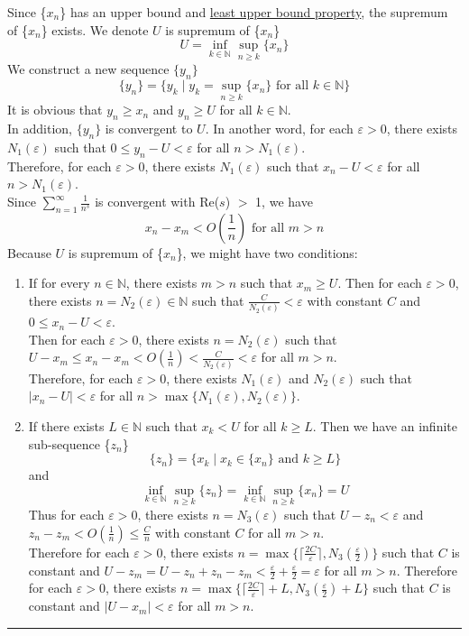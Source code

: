 \documentclass[12pt]{article}
\numberwithin{equation}{section}
\theoremstyle{plain} %
\theoremstyle{definition}
\theoremstyle{remark}
\newenvironment{proof}{{\bf Proof:}}{\hfill\rule{2mm}{2mm}}
\begin{document}
\begin{proof}
Since \{$x_n$\} has an upper bound and \href{https://en.wikipedia.org/wiki/Least-upper-bound_property}{least upper bound property}, the supremum of \{$x_n$\} exists. We denote $U$ is supremum of \{$x_n$\}
$$U = \inf\limits_{k \in \mathbb{N}}\sup\limits_{n \geqslant k}\{x_n\}$$
We construct a new sequence $\{y_n\}$ 
$$\{y_n\} = \{y_k \mid y_k = \sup\limits_{n \geqslant k}\{x_n\} \text{ for all }k \in \mathbb{N}\}$$ 
It is obvious that $y_n \geqslant x_n$ and $y_n \geqslant U$ for all $k \in \mathbb{N}$. \\
In addition, $\{y_n\}$ is convergent to $U$. In another word, for each $\varepsilon > 0$, there exists $N_1(\varepsilon)$ such that $0 \leqslant y_n - U < \varepsilon$ for all $n > N_1(\varepsilon)$.\\
Therefore, for each $\varepsilon > 0$, there exists $N_1(\varepsilon)$ such that $x_n - U < \varepsilon$ for all $n > N_1(\varepsilon)$. \\
Since $\sum_{n=1}^{\infty} \frac{1}{n^s}$ is convergent with Re($s$) $>$ 1, we have $$x_n - x_m < O(\frac{1}{n})\text{ for all }m > n$$
Because $U$ is supremum of \{$x_n$\}, we might have two conditions: 
\begin{enumerate}
	\item If for every $n \in \mathbb{N}$, there exists $m > n$ such that $x_m \geqslant U$. Then for each $\varepsilon > 0$, there exists $n = N_2(\varepsilon) \in \mathbb{N}$ such that $\frac{C}{N_2(\varepsilon)} < \varepsilon$ with constant $C$ and $0 \leqslant x_n - U < \varepsilon$.\\
	Then for each $\varepsilon > 0$, there exists $n = N_2(\varepsilon)$ such that $U - x_m \leqslant x_n - x_m < O(\frac{1}{n}) < \frac{C}{N_2(\varepsilon)} < \varepsilon$ for all $m > n$. \\
	Therefore, for each $\varepsilon > 0$, there exists $N_1(\varepsilon)$ and $N_2(\varepsilon)$ such that $\lvert x_n - U \rvert< \varepsilon$ for all $n > \max\{N_1(\varepsilon), N_2(\varepsilon)\}$.
	
	\item If there exists $L \in \mathbb{N}$ such that $x_k < U$ for all $k \geqslant L$. Then we have an infinite sub-sequence \{$z_n$\}
	$$\{z_n\} = \{x_k \mid x_k \in \{x_n\}\text{ and }k \geqslant L \}$$ 
	and
	$$\inf\limits_{k \in \mathbb{N}}\sup\limits_{n \geqslant k}\{z_n\} = \inf\limits_{k \in \mathbb{N}}\sup\limits_{n \geqslant k}\{x_n\} = U$$
	Thus for each $\varepsilon > 0$, there exists $n = N_3(\varepsilon)$ such that $U - z_n < \varepsilon$ and $z_n - z_m < O(\frac{1}{n}) \leqslant \frac{C}{n}$ with constant $C$ for all $m > n$. \\
	Therefore for each $\varepsilon > 0$, there exists $n = \max\{\lceil \frac{2C}{\varepsilon} \rceil, N_3(\frac{\varepsilon}{2})\}$ such that $C$ is constant and $U - z_m = U - z_n + z_n - z_m < \frac{\varepsilon}{2} + \frac{\varepsilon}{2} = \varepsilon$ for all $m > n$. 
	Therefore for each $\varepsilon > 0$, there exists $n = \max\{\lceil \frac{2C}{\varepsilon} \rceil + L, N_3(\frac{\varepsilon}{2}) + L\}$ such that $C$ is constant and $\lvert U - x_m \rvert < \varepsilon$ for all $m > n$. 
\end{enumerate}


\end{proof}
\end{document}
